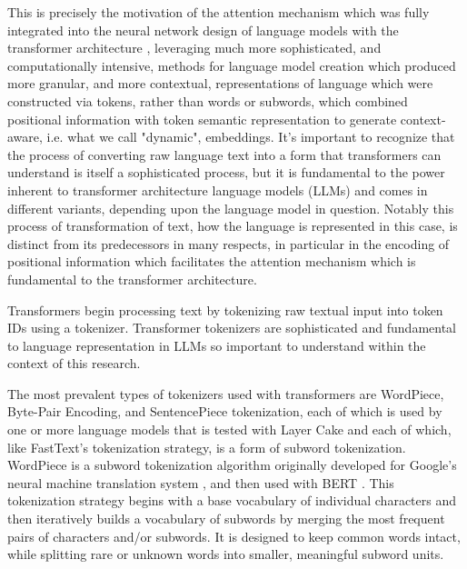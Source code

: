 \documentclass[final]{clv2025}
\begin{document}
This is precisely the motivation of the attention mechanism \cite{bahdanau2016neuralmachinetranslationjointly} which was fully integrated into the neural network design of language models with the transformer architecture \cite{vaswani}, leveraging much more sophisticated, and computationally intensive, methods for language model creation which produced more granular, and more contextual, representations of language which were constructed via tokens, rather than words or subwords, which combined positional information with token semantic representation to generate context-aware, i.e. what we call "dynamic", embeddings. It’s important to recognize that the process of converting raw language text into a form that transformers can understand is itself a sophisticated process, but it is fundamental to the power inherent to transformer architecture language models (LLMs) and comes in different variants, depending upon the language model in question. Notably this process of transformation of text, how the language is represented in this case, is distinct from its predecessors in many respects, in particular in the encoding of positional information which facilitates the attention mechanism which is fundamental to the transformer architecture.

Transformers begin processing text by tokenizing raw textual input into token IDs using a tokenizer. Transformer tokenizers are sophisticated and fundamental to language representation in LLMs so important to understand within the context of this research. 

The most prevalent types of tokenizers used with transformers are WordPiece, Byte-Pair Encoding, and SentencePiece tokenization, each of which is used by one or more language models that is tested with Layer Cake and each of which, like FastText’s tokenization strategy, is a form of subword tokenization. WordPiece is a subword tokenization algorithm originally developed for Google’s neural machine translation system \cite{schuster} \cite{wu}, and then used with BERT \cite{devlin-etal-2019-bert}. This tokenization strategy begins with a base vocabulary of individual characters and then iteratively builds a vocabulary of subwords by merging the most frequent pairs of characters and/or subwords. It is designed to keep common words intact, while splitting rare or unknown words into smaller, meaningful subword units. 
\end{document}
